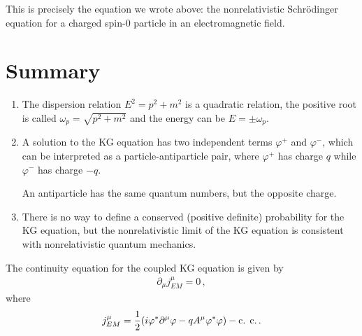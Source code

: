 \documentclass[main.tex]{subfiles}
\begin{document}
This is precisely the equation we wrote above: the nonrelativistic Schrödinger equation for a charged spin-0 particle in an electromagnetic field. 

\section{Summary}

\begin{enumerate}
  \item The dispersion relation \(E^2 = p^2+m^2\) is a quadratic relation, the positive root is called \(\omega_{p} = \sqrt{p^2+m^2}\) and the energy can be \(E = \pm \omega_{p}\). 
  \item A solution to the KG equation has two independent terms \(\varphi^{+}\) and \(\varphi^{-}\), which can be interpreted as a particle-antiparticle pair, where \(\varphi^{+}\) has charge \(q\) while \(\varphi^{-}\) has charge \(-q\). 
  
  An antiparticle has the same quantum numbers, but the opposite charge. 
  \item There is no way to define a conserved (positive definite) probability for the KG equation, but the nonrelativistic limit of the KG equation is consistent with nonrelativistic quantum mechanics. 
\end{enumerate}

\begin{claim}
The continuity equation for the coupled KG equation is given by 
%
\begin{align}
\partial_{\mu } j^{\mu }_{EM} = 0
\,,
\end{align}
%
where 
%
\begin{align}
j^{\mu }_{EM} = \frac{1}{2} \qty(i \varphi^{*} \partial^{\mu } \varphi   - q A^{\mu } \varphi^{*} \varphi ) - \text{c. c.}
\,.
\end{align}
\end{claim}
\end{document}
